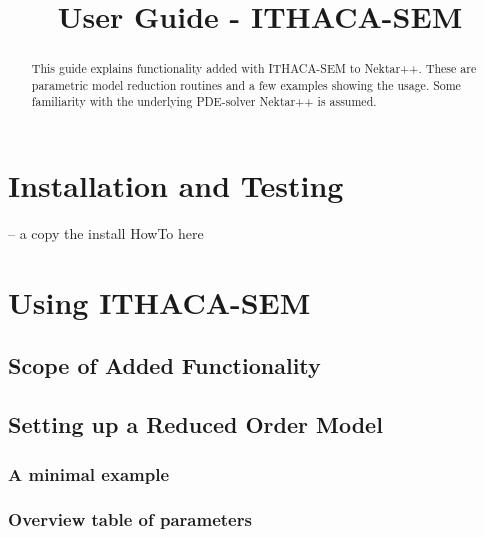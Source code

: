 \documentclass[a4paper,10pt]{article}
\title{User Guide - ITHACA-SEM}
\author{}
\begin{document}
\maketitle

\begin{abstract}
This guide explains functionality added with ITHACA-SEM to Nektar++. These are 
parametric model reduction routines and a few examples showing the usage.
Some familiarity with the underlying PDE-solver Nektar++ is assumed. 
\end{abstract}

\section{Installation and Testing}

-- a copy the install HowTo here

\section{Using ITHACA-SEM}

\subsection{Scope of Added Functionality}


\subsection{Setting up a Reduced Order Model}

\subsubsection{A minimal example}

\subsubsection{Overview table of parameters}
\end{document}
